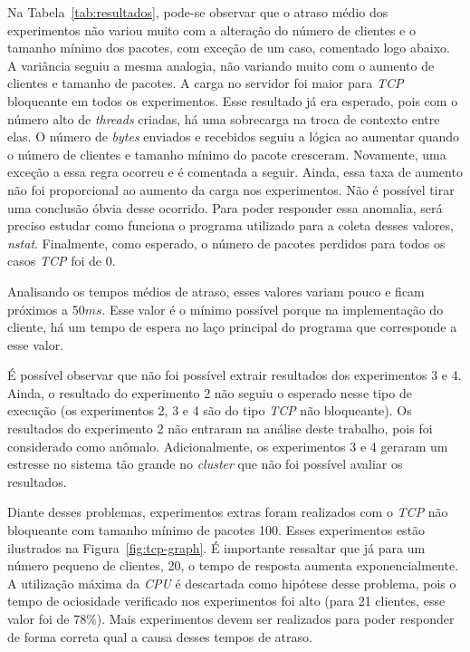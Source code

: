 \documentclass[12pt]{article}
\begin{document}
Na Tabela~\ref{tab:resultados}, pode-se observar que o atraso médio dos experimentos não variou muito com a alteração do número de clientes e o tamanho mínimo dos pacotes, com exceção de um caso, comentado logo abaixo. A variância seguiu a mesma analogia, não variando muito com o aumento de clientes e tamanho de pacotes. A carga no servidor foi maior para \emph{TCP} bloqueante em todos os experimentos. Esse resultado já era esperado, pois com o número alto de \emph{threads} criadas, há uma sobrecarga na troca de contexto entre elas. O número de \emph{bytes} enviados e recebidos seguiu a lógica ao aumentar quando o número de clientes e tamanho mínimo do pacote cresceram. Novamente, uma exceção a essa regra ocorreu e é comentada a seguir. Ainda, essa taxa de aumento não foi proporcional ao aumento da carga nos experimentos. Não é possível tirar uma conclusão óbvia desse ocorrido. Para poder responder essa anomalia, será preciso estudar como funciona o programa utilizado para a coleta desses valores, \emph{nstat}. Finalmente, como esperado, o número de pacotes perdidos para todos os casos \emph{TCP} foi de 0.

Analisando os tempos médios de atraso, esses valores variam pouco e ficam próximos a 50$ms$. Esse valor é o mínimo possível porque na implementação do cliente, há um tempo de espera no laço principal do programa que corresponde a esse valor.

É possível observar que não foi possível extrair resultados dos experimentos 3 e 4. Ainda, o resultado do experimento 2 não seguiu o esperado nesse tipo de execução (os experimentos 2, 3 e 4 são do tipo \emph{TCP} não bloqueante). Os resultados do experimento 2 não entraram na análise deste trabalho, pois foi considerado como anômalo. Adicionalmente, os experimentos 3 e 4 geraram um estresse no sistema tão grande no \emph{cluster} que não foi possível avaliar os resultados.

Diante desses problemas, experimentos extras foram realizados com o \emph{TCP} não bloqueante com tamanho mínimo de pacotes 100. Esses experimentos estão ilustrados na Figura~\ref{fig:tcp-graph}. É importante ressaltar que já para um número pequeno de clientes, 20, o tempo de resposta aumenta exponencialmente. A utilização máxima da \emph{CPU} é descartada como hipótese desse problema, pois o tempo de ociosidade verificado nos experimentos foi alto (para 21 clientes, esse valor foi de 78\%). Mais experimentos devem ser realizados para poder responder de forma correta qual a causa desses tempos de atraso.
\end{document}
